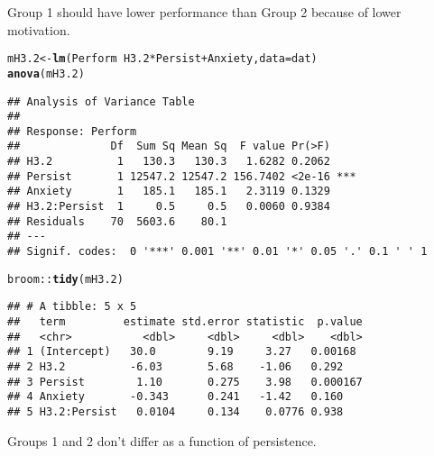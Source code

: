 \documentclass{article}\usepackage[]{graphicx}\usepackage[]{color}
\makeatletter
\newcommand{\hlopt}[1]{\textcolor[rgb]{0,0,0}{#1}}%
\newcommand{\hlstd}[1]{\textcolor[rgb]{0.345,0.345,0.345}{#1}}%
\newcommand{\hlkwb}[1]{\textcolor[rgb]{0.69,0.353,0.396}{#1}}%
\newcommand{\hlkwc}[1]{\textcolor[rgb]{0.333,0.667,0.333}{#1}}%
\newcommand{\hlkwd}[1]{\textcolor[rgb]{0.737,0.353,0.396}{\textbf{#1}}}%
\newenvironment{kframe}{%
 \def\at@end@of@kframe{}%
 \ifinner\ifhmode%
  \def\at@end@of@kframe{\end{minipage}}%
  \begin{minipage}{\columnwidth}%
 \fi\fi%
 \def\FrameCommand##1{\hskip\@totalleftmargin \hskip-\fboxsep
 \colorbox{shadecolor}{##1}\hskip-\fboxsep
     \hskip-\linewidth \hskip-\@totalleftmargin \hskip\columnwidth}%
 \MakeFramed {\advance\hsize-\width
   \@totalleftmargin\z@ \linewidth\hsize
   \@setminipage}}%
 {\par\unskip\endMakeFramed%
 \at@end@of@kframe}
\newenvironment{knitrout}{}{} %
\makeatother
\begin{document}
Group 1 should have lower performance than Group 2 because of lower motivation.
\begin{knitrout}
\color{fgcolor}\begin{kframe}
\begin{alltt}
\hlstd{mH3.2} \hlkwb{<-} \hlkwd{lm}\hlstd{(Perform} \hlopt{~} \hlstd{H3.2}\hlopt{*}\hlstd{Persist} \hlopt{+} \hlstd{Anxiety,} \hlkwc{data} \hlstd{= dat)}
\hlkwd{anova}\hlstd{(mH3.2)}
\end{alltt}
\begin{verbatim}
## Analysis of Variance Table
## 
## Response: Perform
##              Df  Sum Sq Mean Sq  F value Pr(>F)    
## H3.2          1   130.3   130.3   1.6282 0.2062    
## Persist       1 12547.2 12547.2 156.7402 <2e-16 ***
## Anxiety       1   185.1   185.1   2.3119 0.1329    
## H3.2:Persist  1     0.5     0.5   0.0060 0.9384    
## Residuals    70  5603.6    80.1                    
## ---
## Signif. codes:  0 '***' 0.001 '**' 0.01 '*' 0.05 '.' 0.1 ' ' 1
\end{verbatim}
\begin{alltt}
\hlstd{broom}\hlopt{::}\hlkwd{tidy}\hlstd{(mH3.2)}
\end{alltt}
\begin{verbatim}
## # A tibble: 5 x 5
##   term         estimate std.error statistic  p.value
##   <chr>           <dbl>     <dbl>     <dbl>    <dbl>
## 1 (Intercept)   30.0        9.19     3.27   0.00168 
## 2 H3.2          -6.03       5.68    -1.06   0.292   
## 3 Persist        1.10       0.275    3.98   0.000167
## 4 Anxiety       -0.343      0.241   -1.42   0.160   
## 5 H3.2:Persist   0.0104     0.134    0.0776 0.938
\end{verbatim}
\end{kframe}
\end{knitrout}

Groups 1 and 2 don't differ as a function of persistence.
\end{document}
